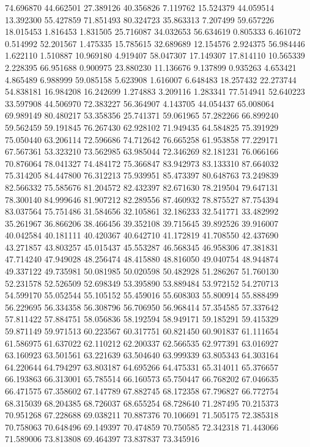 74.696870
44.662501
27.389126
40.356826
7.119762
15.524379
44.059514
13.392300
55.427859
71.851493
80.324723
35.863313
7.207499
59.657226
18.015453
1.816453
1.831505
25.716087
34.032653
56.634619
0.805333
6.461072
0.514992
52.201567
1.475335
15.785615
32.689689
12.154576
2.924375
56.984446
1.622110
1.510887
10.969180
4.919407
58.047307
17.149307
17.814110
10.565339
2.228395
66.951688
0.900975
23.880230
11.136676
9.137899
0.935263
4.653421
4.865489
6.988999
59.085158
5.623908
1.616007
6.648483
18.257432
22.273744
54.838181
16.984208
16.242699
1.274883
3.209116
1.283341
77.514941
52.640223
33.597908
44.506970
72.383227
56.364907
4.143705
44.054437
65.008064
69.989149
80.480217
53.358356
25.741371
59.061965
57.282266
66.899240
59.562459
59.191845
76.267430
62.928102
71.949435
64.584825
75.391929
75.050440
63.206114
72.596686
74.712642
76.665258
61.953858
77.229171
67.567361
53.323210
73.562985
63.985044
72.346269
82.181231
76.066166
70.876064
78.041327
74.484172
75.366847
83.942973
83.133310
87.664032
75.314205
84.447800
76.312213
75.939951
85.473397
80.648763
73.249839
82.566332
75.585676
81.204572
82.432397
82.671630
78.219504
79.647131
78.300140
84.999646
81.907212
82.289556
87.460932
78.875527
87.754394
83.037564
75.751486
31.584656
32.105861
32.186233
32.541771
33.482992
35.261967
36.866206
38.466456
39.352108
39.715645
39.892526
39.916007
40.042584
40.181111
40.420367
40.642710
41.172819
41.708550
42.437690
43.271857
43.803257
45.015437
45.553287
46.568345
46.958306
47.381831
47.714240
47.949028
48.256474
48.415880
48.816050
49.040754
48.944874
49.337122
49.735981
50.081985
50.020598
50.482928
51.286267
51.760130
52.231578
52.526509
52.698349
53.395890
53.889484
53.972152
54.270713
54.599170
55.052544
55.105152
55.459016
55.608303
55.800914
55.888499
56.229695
56.334358
56.308796
56.706950
56.968414
57.354585
57.337642
57.811422
57.884751
58.056836
58.192594
58.949171
59.185291
59.415329
59.871149
59.971513
60.223567
60.317751
60.821450
60.901837
61.111654
61.586975
61.637022
62.110212
62.200337
62.566535
62.977391
63.016927
63.160923
63.501561
63.221639
63.504640
63.999339
63.805343
64.303164
64.220644
64.794297
63.803187
64.695266
64.475331
65.314011
65.376657
66.193863
66.313001
65.785514
66.160573
65.750447
66.768202
67.046635
66.471575
67.358602
67.147789
67.882745
68.172358
67.796827
66.772754
68.315039
68.204385
68.726037
68.655254
68.728640
71.287495
70.215373
70.951268
67.228688
69.038211
70.887376
70.106691
71.505175
72.385318
70.758063
70.648496
69.149397
70.474859
70.750585
72.342318
71.443066
71.589006
73.813808
69.464397
73.837837
73.345916
